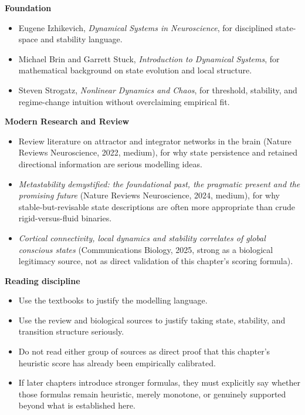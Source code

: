 \begin{readingbox}
\textbf{Foundation}
\begin{itemize}[nosep]
  \item Eugene Izhikevich, \emph{Dynamical Systems in Neuroscience}, for
        disciplined state-space and stability language.
  \item Michael Brin and Garrett Stuck, \emph{Introduction to Dynamical
        Systems}, for mathematical background on state evolution and local
        structure.
  \item Steven Strogatz, \emph{Nonlinear Dynamics and Chaos}, for threshold,
        stability, and regime-change intuition without overclaiming empirical
        fit.
\end{itemize}
\textbf{Modern Research and Review}
\begin{itemize}[nosep]
  \item Review literature on attractor and integrator networks in the brain
        (Nature Reviews Neuroscience, 2022, medium), for why state persistence
        and retained directional information are serious modelling ideas.
  \item \emph{Metastability demystified: the foundational past, the pragmatic
        present and the promising future} (Nature Reviews Neuroscience, 2024,
        medium), for why stable-but-revisable state descriptions are often more
        appropriate than crude rigid-versus-fluid binaries.
  \item \emph{Cortical connectivity, local dynamics and stability correlates of
        global conscious states} (Communications Biology, 2025, strong as a
        biological legitimacy source, not as direct validation of this
        chapter's scoring formula).
\end{itemize}
\textbf{Reading discipline}
\begin{itemize}[nosep]
  \item Use the textbooks to justify the modelling language.
  \item Use the review and biological sources to justify taking state,
        stability, and transition structure seriously.
  \item Do not read either group of sources as direct proof that this chapter's
        heuristic score has already been empirically calibrated.
  \item If later chapters introduce stronger formulas, they must explicitly say
        whether those formulas remain heuristic, merely monotone, or genuinely
        supported beyond what is established here.
\end{itemize}
\end{readingbox}

